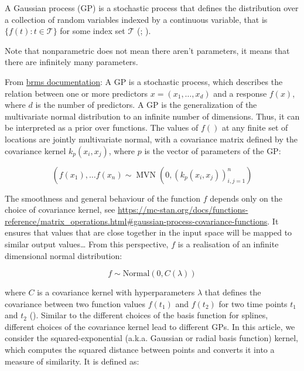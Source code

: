 \documentclass[
  doc,
  floatsintext,
  longtable,
  a4paper,
  nolmodern,
  notxfonts,
  notimes,
  colorlinks=true,linkcolor=blue,citecolor=blue,urlcolor=blue]{apa7}
\begin{document}
A Gaussian process (GP) is a stochastic process that defines the
distribution over a collection of random variables indexed by a
continuous variable, that is \(\{f(t): t \in \mathcal{T}\}\) for some
index set \(\mathcal{T}\) (;
).

Note that nonparametric does not mean there aren't parameters, it means
that there are infinitely many parameters.

From
\href{https://www.rdocumentation.org/packages/brms/versions/2.22.0/topics/gp}{brms
documentation}: A GP is a stochastic process, which describes the
relation between one or more predictors
\(x=\left(x_1, \ldots, x_d\right)\) and a response \(f(x)\), where \(d\)
is the number of predictors. A GP is the generalization of the
multivariate normal distribution to an infinite number of dimensions.
Thus, it can be interpreted as a prior over functions. The values of
\(f()\) at any finite set of locations are jointly multivariate normal,
with a covariance matrix defined by the covariance kernel
\(k_p\left(x_i, x_j\right)\), where \(p\) is the vector of parameters of
the GP:

\[
\left(f\left(x_1\right), \ldots f\left(x_n\right) \sim \operatorname{MVN}\left(0,\left(k_p\left(x_i, x_j\right)\right)_{i, j=1}^n\right)\right.
\]

The smoothness and general behaviour of the function \(f\) depends only
on the choice of covariance kernel, see
\url{https://mc-stan.org/docs/functions-reference/matrix_operations.html\#gaussian-process-covariance-functions}.
It ensures that values that are close together in the input space will
be mapped to similar output values\ldots{} From this perspective, \(f\)
is a realisation of an infinite dimensional normal distribution:

\[
f \sim \mathrm{Normal}(0, C(\lambda))
\]

where \(C\) is a covariance kernel with hyperparameters \(\lambda\) that
defines the covariance between two function values \(f\left(t_1\right)\)
and \(f\left(t_2\right)\) for two time points \(t_1\) and \(t_2\)
(). Similar to
the different choices of the basis function for splines, different
choices of the covariance kernel lead to different GPs. In this article,
we consider the squared-exponential (a.k.a. Gaussian or radial basis
function) kernel, which computes the squared distance between points and
converts it into a measure of similarity. It is defined as:
\end{document}
